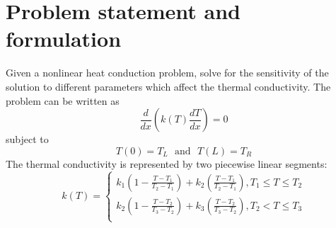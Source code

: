 \documentclass{article}
\begin{document}
\section{Problem statement and formulation}

Given a nonlinear heat conduction problem, solve for the sensitivity of the solution to different parameters which affect the thermal conductivity.  The problem can be written as 
\begin{equation}
  \frac{d}{dx} \left(k(T) \frac{dT}{dx} \right) = 0
\end{equation}
subject to
\begin{equation}
  T(0) = T_L \ \ \ \text{and} \ \ \ T(L) = T_R
\end{equation}
The thermal conductivity is represented by two piecewise linear segments:
\begin{equation}
  k(T) = \begin{cases}
    \displaystyle k_1\left(1 - \frac{T - T_1}{T_2 - T_1}\right) + k_2 \left(\frac{T-T_1}{T_2 - T_1} \right), T_1 \leqslant T \leqslant T_2 \\[0.15in]
    \displaystyle k_2\left(1 - \frac{T - T_2}{T_3 - T_2}\right) + k_3 \left(\frac{T-T_2}{T_3 - T_2} \right), T_2 < T \leqslant T_3 \\
  \end{cases}
\end{equation}
\end{document}
